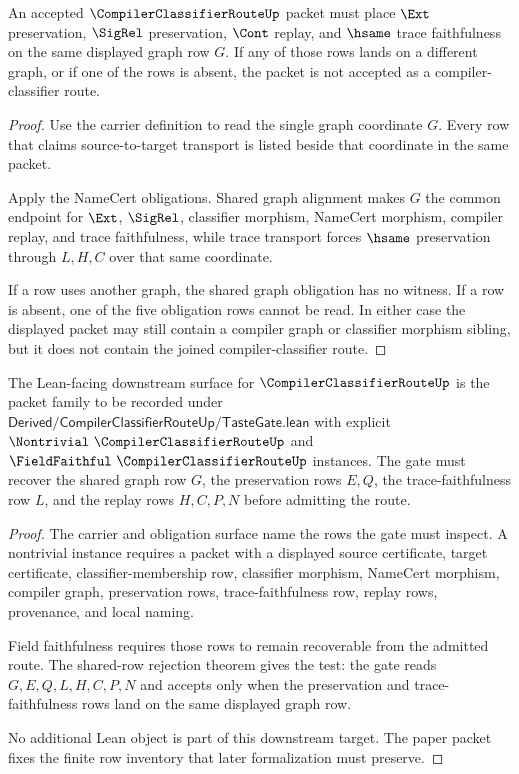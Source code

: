 \begin{theorem}
\label{thm:compiler-classifier-route-shared-row-rejection}
An accepted $\CompilerClassifierRouteUp$ packet must place $\Ext$ preservation, $\SigRel$ preservation, $\Cont$ replay, and $\hsame$ trace faithfulness on the same displayed graph row $G$. If any of those rows lands on a different graph, or if one of the rows is absent, the packet is not accepted as a compiler-classifier route.
\end{theorem}
\begin{proof}
Use the carrier definition to read the single graph coordinate $G$. Every row that claims source-to-target transport is listed beside that coordinate in the same packet.

Apply the NameCert obligations. Shared graph alignment makes $G$ the common endpoint for $\Ext$, $\SigRel$, classifier morphism, NameCert morphism, compiler replay, and trace faithfulness, while trace transport forces $\hsame$ preservation through $L,H,C$ over that same coordinate.

If a row uses another graph, the shared graph obligation has no witness. If a row is absent, one of the five obligation rows cannot be read. In either case the displayed packet may still contain a compiler graph or classifier morphism sibling, but it does not contain the joined compiler-classifier route.
\end{proof}

\begin{theorem}
\label{thm:compiler-classifier-route-downstream-target}
The Lean-facing downstream surface for $\CompilerClassifierRouteUp$ is the packet family to be recorded under $\mathsf{Derived/CompilerClassifierRouteUp/TasteGate.lean}$ with explicit $\Nontrivial\ \CompilerClassifierRouteUp$ and $\FieldFaithful\ \CompilerClassifierRouteUp$ instances. The gate must recover the shared graph row $G$, the preservation rows $E,Q$, the trace-faithfulness row $L$, and the replay rows $H,C,P,N$ before admitting the route.
\end{theorem}
\begin{proof}
The carrier and obligation surface name the rows the gate must inspect. A nontrivial instance requires a packet with a displayed source certificate, target certificate, classifier-membership row, classifier morphism, NameCert morphism, compiler graph, preservation rows, trace-faithfulness row, replay rows, provenance, and local naming.

Field faithfulness requires those rows to remain recoverable from the admitted route. The shared-row rejection theorem gives the test: the gate reads $G,E,Q,L,H,C,P,N$ and accepts only when the preservation and trace-faithfulness rows land on the same displayed graph row.

No additional Lean object is part of this downstream target. The paper packet fixes the finite row inventory that later formalization must preserve.
\end{proof}

